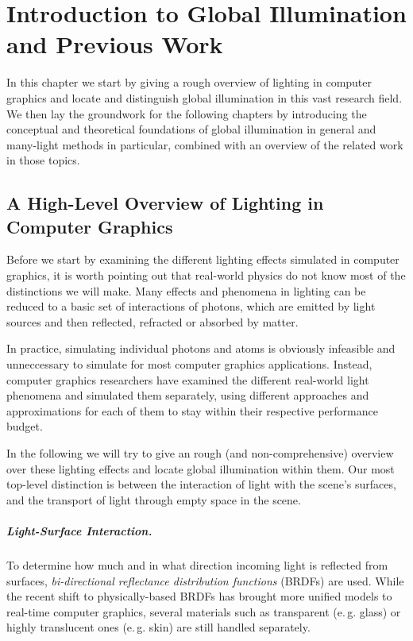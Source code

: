 
\chapter{Introduction to Global Illumination and Previous Work}
\label{chap:introductionGI}

In this chapter we start by giving a rough overview of lighting in computer graphics and locate and distinguish global illumination in this vast research field.
We then lay the groundwork for the following chapters by introducing the conceptual and theoretical foundations of global illumination in general and many-light methods in particular, combined with an overview of the related work in those topics.


\section{A High-Level Overview of Lighting in Computer Graphics}

Before we start by examining the different lighting effects simulated in computer graphics, it is worth pointing out that real-world physics do not know most of the distinctions we will make. Many effects and phenomena in lighting can be reduced to a basic set of interactions of photons, which are emitted by light sources and then reflected, refracted or absorbed by matter.

In practice, simulating individual photons and atoms is obviously infeasible and unneccessary to simulate for most computer graphics applications. Instead, computer graphics researchers have examined the different real-world light phenomena and simulated them separately, using different approaches and approximations for each of them to stay within their respective performance budget.


In the following we will try to give an rough (and non-comprehensive) overview over these lighting effects and locate global illumination within them. Our most top-level distinction is between the interaction of light with the scene's surfaces, and the transport of light through empty space in the scene.

\paragraph{Light-Surface Interaction.}

To determine how much and in what direction incoming light is reflected from surfaces, \textit{bi-directional reflectance distribution functions} (BRDFs) are used. While the recent shift to physically-based BRDFs has brought more unified models to real-time computer graphics, several materials such as transparent (e.\,g. glass) or highly translucent ones (e.\,g. skin) are still handled separately.



